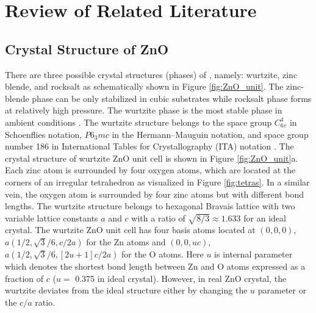 \chapter{Review of Related Literature} \label{chap:rrl}
\section{Crystal Structure of ZnO}
There are three possible crystal structures (phases) of , namely: wurtzite, zinc blende, and rocksalt as schematically shown in Figure \ref{fig:ZnO_unit}. The zinc-blende phase can be only stabilized in cubic substrates while rocksalt phase forms at relatively high pressure. The wurtzite phase is the most stable phase in ambient conditions \citep{Oezguer2005}. The wurtzite structure belongs to the space group $C^4_{6v}$ in Schoenflies notation, $P6_3mc$ in the  Hermann–Mauguin notation, and space group number 186 in International Tables for Crystallography (ITA) notation \citep{Hahn2005}. The crystal structure of wurtzite ZnO unit cell is shown in Figure \ref{fig:ZnO_unit}a. Each zinc atom is surrounded by four oxygen atoms, which are located at the corners of an irregular tetrahedron as visualized in Figure \ref{fig:tetras}. In a similar vein, the oxygen atom is surrounded by four zinc atoms but with different bond lengths. The wurtzite structure belongs to hexagonal Bravais lattice with two variable lattice constants $a$ and $c$ with a ratio of $\sqrt{8/3} \approx 1.633$ for an ideal crystal.  The wurtzite ZnO unit cell has four basis atoms located at $(0,0,0)$, $a(1/2,\sqrt{3}/6,c/2a)$ for the Zn atoms 
 and $(0,0,uc)$, $a(1/2,\sqrt{3}/6,[2u+1]c/2a)$ for the O atoms. 
Here  $u$ is internal parameter which denotes the shortest bond length between Zn and O atoms expressed as a fraction of $c$ ($u=$ 0.375 in  ideal crystal). However, in real ZnO crystal, the wurtzite deviates from the ideal structure either by changing the $u$ parameter or the $c/a$ ratio.

